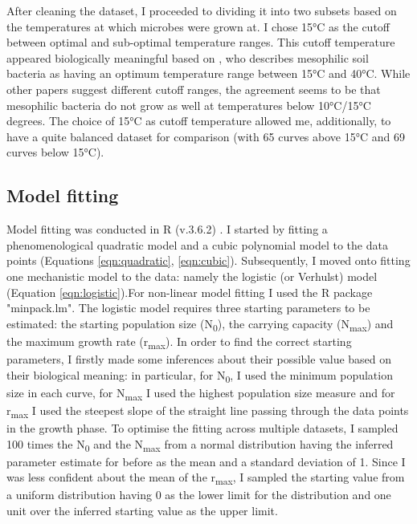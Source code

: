 \documentclass[a4paper]{article}
\begin{document}
    After cleaning the dataset, I proceeded to dividing it into two subsets based on the temperatures at which microbes were grown at. I chose 15°C as the cutoff between optimal and sub-optimal temperature ranges. This cutoff temperature appeared biologically meaningful based on \cite{HARTEL2005448}, who describes mesophilic soil bacteria as having an optimum temperature range between 15°C and 40°C. While other papers suggest different cutoff ranges, the agreement seems to be that mesophilic bacteria do not grow as well at temperatures below 10°C/15°C degrees. The choice of 15°C as cutoff temperature allowed me, additionally, to have a quite balanced dataset for comparison (with 65 curves above 15°C and 69 curves below 15°C).
    
    \subsection{Model fitting}
    Model fitting was conducted in R (v.3.6.2) \citep{Rcit}. I started by fitting a phenomenological quadratic model and a cubic polynomial model to the data points (Equations \ref{eqn:quadratic}, \ref{eqn:cubic}). 
    Subsequently, I moved onto fitting one mechanistic model to the data: namely the logistic (or Verhulst) model (Equation \ref{eqn:logistic}).\newline For non-linear model fitting I used the R package "minpack.lm". The logistic model requires three starting parameters to be estimated: the starting population size (N\textsubscript{0}), the carrying capacity (N\textsubscript{max}) and the maximum growth rate (r\textsubscript{max}). In order to find the correct starting parameters, I firstly made some inferences about their possible value based on their biological meaning: in particular, for N\textsubscript{0}, I used the minimum population size in each curve, for N\textsubscript{max} I used the highest population size measure and for r\textsubscript{max} I used the steepest slope of the straight line passing through the data points in the growth phase. To optimise the fitting across multiple datasets, I sampled 100 times the N\textsubscript{0} and the N\textsubscript{max} from a normal distribution having the inferred parameter estimate for before as the mean and a standard deviation of 1. Since I was less confident about the mean of the r\textsubscript{max}, I sampled the starting value from a uniform distribution having 0 as the lower limit for the distribution and one unit over the inferred starting value as the upper limit. 
    
\end{document}

